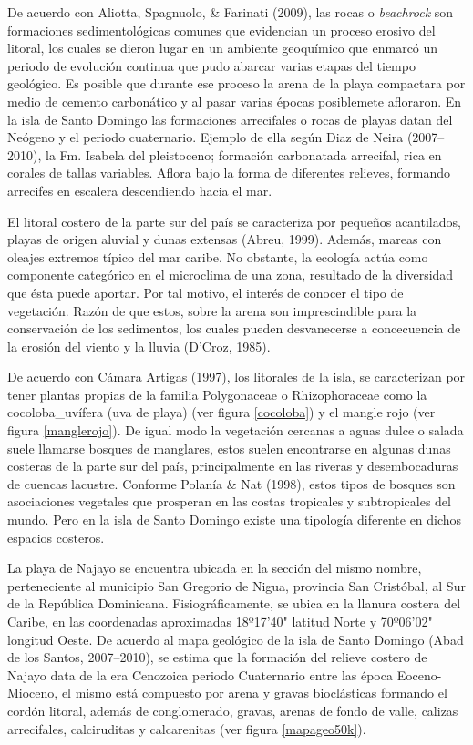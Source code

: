 \documentclass[11pt,]{article}
\begin{document}
De acuerdo con Aliotta, Spagnuolo, \& Farinati (2009), las rocas o
\emph{beachrock} son formaciones sedimentológicas comunes que evidencian
un proceso erosivo del litoral, los cuales se dieron lugar en un
ambiente geoquímico que enmarcó un periodo de evolución continua que
pudo abarcar varias etapas del tiempo geológico. Es posible que durante
ese proceso la arena de la playa compactara por medio de cemento
carbonático y al pasar varias épocas posiblemete afloraron. En la isla
de Santo Domingo las formaciones arrecifales o rocas de playas datan del
Neógeno y el periodo cuaternario. Ejemplo de ella según Diaz de Neira
(2007--2010), la Fm. Isabela del pleistoceno; formación carbonatada
arrecifal, rica en corales de tallas variables. Aflora bajo la forma de
diferentes relieves, formando arrecifes en escalera descendiendo hacia
el mar.

El litoral costero de la parte sur del país se caracteriza por pequeños
acantilados, playas de origen aluvial y dunas extensas (Abreu, 1999).
Además, mareas con oleajes extremos típico del mar caribe. No obstante,
la ecología actúa como componente categórico en el microclima de una
zona, resultado de la diversidad que ésta puede aportar. Por tal motivo,
el interés de conocer el tipo de vegetación. Razón de que estos, sobre
la arena son imprescindible para la conservación de los sedimentos, los
cuales pueden desvanecerse a concecuencia de la erosión del viento y la
lluvia (D'Croz, 1985).

De acuerdo con Cámara Artigas (1997), los litorales de la isla, se
caracterizan por tener plantas propias de la familia Polygonaceae o
Rhizophoraceae como la cocoloba\_uvífera (uva de playa) (ver figura
\ref{cocoloba}) y el mangle rojo (ver figura \ref{manglerojo}). De igual
modo la vegetación cercanas a aguas dulce o salada suele llamarse
bosques de manglares, estos suelen encontrarse en algunas dunas costeras
de la parte sur del país, principalmente en las riveras y desembocaduras
de cuencas lacustre. Conforme Polanía \& Nat (1998), estos tipos de
bosques son asociaciones vegetales que prosperan en las costas
tropicales y subtropicales del mundo. Pero en la isla de Santo Domingo
existe una tipología diferente en dichos espacios costeros.

La playa de Najayo se encuentra ubicada en la sección del mismo nombre,
perteneciente al municipio San Gregorio de Nigua, provincia San
Cristóbal, al Sur de la República Dominicana. Fisiográficamente, se
ubica en la llanura costera del Caribe, en las coordenadas aproximadas
18º17'40" latitud Norte y 70º06'02" longitud Oeste. De acuerdo al mapa
geológico de la isla de Santo Domingo (Abad de los Santos, 2007--2010),
se estima que la formación del relieve costero de Najayo data de la era
Cenozoica periodo Cuaternario entre las época Eoceno-Mioceno, el mismo
está compuesto por arena y gravas bioclásticas formando el cordón
litoral, además de conglomerado, gravas, arenas de fondo de valle,
calizas arrecifales, calciruditas y calcarenitas (ver figura
\ref{mapageo50k}).
\end{document}
